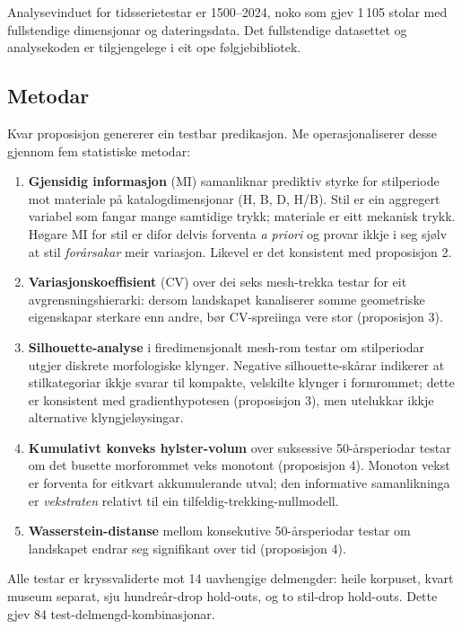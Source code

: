 Analysevinduet for tidsserietestar er 1500--2024, noko som gjev 1\,105 stolar med fullstendige dimensjonar og dateringsdata. Det fullstendige datasettet og analysekoden er tilgjengelege i eit ope følgjebibliotek.

\subsection{Metodar}

Kvar proposisjon genererer ein testbar predikasjon. Me operasjonaliserer desse gjennom fem statistiske metodar:

\begin{enumerate}
\item \textbf{Gjensidig informasjon} (MI) samanliknar prediktiv styrke for stilperiode mot materiale på katalogdimensjonar (H, B, D, H/B). Stil er ein aggregert variabel som fangar mange samtidige trykk; materiale er eitt mekanisk trykk. Høgare MI for stil er difor delvis forventa \textit{a priori} og provar ikkje i seg sjølv at stil \textit{forårsakar} meir variasjon. Likevel er det konsistent med proposisjon 2.

\item \textbf{Variasjonskoeffisient} (CV) over dei seks mesh-trekka testar for eit avgrensningshierarki: dersom landskapet kanaliserer somme geometriske eigenskapar sterkare enn andre, bør CV-spreiinga vere stor (proposisjon 3).

\item \textbf{Silhouette-analyse} i firedimensjonalt mesh-rom testar om stilperiodar utgjer diskrete morfologiske klynger. Negative silhouette-skårar indikerer at stilkategoriar ikkje svarar til kompakte, velskilte klynger i formrommet; dette er konsistent med gradienthypotesen (proposisjon 3), men utelukkar ikkje alternative klyngjeløysingar.

\item \textbf{Kumulativt konveks hylster-volum} over suksessive 50-årsperiodar testar om det busette morforommet veks monotont (proposisjon 4). Monoton vekst er forventa for eitkvart akkumulerande utval; den informative samanlikninga er \textit{vekstraten} relativt til ein tilfeldig-trekking-nullmodell.

\item \textbf{Wasserstein-distanse} mellom konsekutive 50-årsperiodar testar om landskapet endrar seg signifikant over tid (proposisjon 4).
\end{enumerate}

Alle testar er kryssvaliderte mot 14 uavhengige delmengder: heile korpuset, kvart museum separat, sju hundreår-drop hold-outs, og to stil-drop hold-outs. Dette gjev 84 test-delmengd-kombinasjonar.

